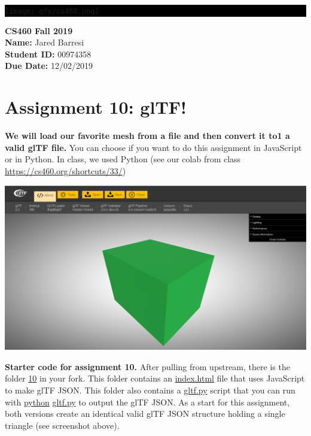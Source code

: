 \documentclass[10pt,oneside,onecolumn,letterpaper]{article}
\begin{document}
\noindent\colorbox{black}{
\begin{minipage}[c]{.99\linewidth}
  \vspace{.4cm}
  \Large{}
  \begin{flushright}
    \vspace{-1.2cm}
    \texttt{[image: gfx/cs460.png]}
  \end{flushright}
\end{minipage}
}


\vspace{.5cm} %

\noindent\textbf{CS460 Fall 2019} \\
\textbf{Name:} Jared Barresi \\
\textbf{Student ID:} 00974358 \\
\textbf{Due Date:} 12/02/2019

\section*{Assignment 10: glTF!}

\textbf{We will load our favorite mesh from a file and then convert it to1 a valid glTF file.} You can choose if you want to do this assignment in JavaScript or in Python. In class, we used Python (see our colab from class \url{https://cs460.org/shortcuts/33/})

\vspace{.5cm} %

\begin{center}
\includegraphics[width=.5\textwidth]{gfx/Screenshot-1.png}
\end{center}

\vspace{.5cm}

\noindent\textbf{Starter code for assignment 10.} After pulling from upstream, there is the folder \url{10} in your fork. This folder contains an \url{index.html} file that uses JavaScript to make glTF JSON. This folder also contains a \url{gltf.py} script that you can run with \url{python} \url{gltf.py} to output the glTF JSON. As a start for this assignment, both versions create an identical valid glTF JSON structure holding a single triangle (see screenshot above).
\end{document}
